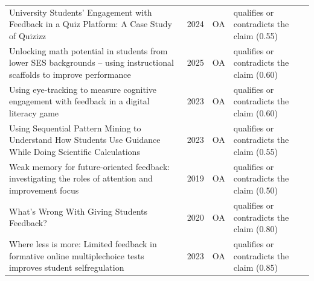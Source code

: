 \begin{longtable}{@{}%
  >{\raggedright\arraybackslash}p{}c%
  >{\raggedright\arraybackslash}p{}%
  >{\raggedright\arraybackslash}p{}@{}}
University Students' Engagement with Feedback in a Quiz Platform: A Case Study of Quizizz & 2024 & OA & qualifies or contradicts the claim (0.55) \\
Unlocking math potential in students from lower SES backgrounds -- using instructional scaffolds to improve performance & 2025 & OA & qualifies or contradicts the claim (0.60) \\
Using eye-tracking to measure cognitive engagement with feedback in a digital literacy game & 2023 & OA & qualifies or contradicts the claim (0.60) \\
Using Sequential Pattern Mining to Understand How Students Use Guidance While Doing Scientific Calculations & 2023 & OA & qualifies or contradicts the claim (0.55) \\
Weak memory for future-oriented feedback: investigating the roles of attention and improvement focus & 2019 & OA & qualifies or contradicts the claim (0.50) \\
What's Wrong With Giving Students Feedback? & 2020 & OA & qualifies or contradicts the claim (0.80) \\
Where less is more: Limited feedback in formative online multiplechoice tests improves student selfregulation & 2023 & OA & qualifies or contradicts the claim (0.85) \\
\end{longtable}
\endgroup
